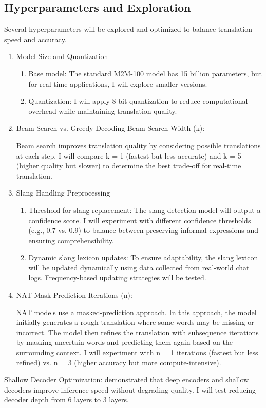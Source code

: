 \documentclass[10pt,twocolumn]{article}
\begin{document}
\subsection{Hyperparameters and Exploration}
Several hyperparameters will be explored and optimized to balance translation speed and accuracy.


\begin{enumerate}
    \item Model Size and Quantization
    \begin{enumerate}
        \item Base model: The standard M2M-100 model has 15 billion parameters, but for real-time applications, I will explore smaller versions.
        \item Quantization: I will apply 8-bit quantization \cite{ZafrirQ8BERT2019} to reduce computational overhead while maintaining translation quality.
    \end{enumerate}
    \item Beam Search vs. Greedy Decoding
Beam Search Width (k): 

Beam search improves translation quality by considering possible translations at each step. I will compare k = 1 (fastest but less accurate) and k = 5 (higher quality but slower) to determine the best trade-off for real-time translation.

    \item Slang Handling Preprocessing
    \begin{enumerate}
        \item Threshold for slang replacement: The slang-detection model will output a confidence score. I will experiment with different confidence thresholds (e.g., 0.7 vs. 0.9) to balance between preserving informal expressions and ensuring comprehensibility.
        \item Dynamic slang lexicon updates: To ensure adaptability, the slang lexicon will be updated dynamically using data collected from real-world chat logs. Frequency-based updating strategies will be tested.
    \end{enumerate}
    \item NAT Mask-Prediction Iterations (n): 

NAT models use a masked-prediction approach. In this approach, the model initially generates a rough translation where some words may be missing or incorrect. The model then refines the translation with subsequence iterations by masking uncertain words and predicting them again based on the surrounding context. I will experiment with n = 1 iterations (fastest but less refined) vs. n = 3 (higher accuracy but more compute-intensive).


\end{enumerate}
Shallow Decoder Optimization: \textcite{KasaiDeepEncoders2021} demonstrated that deep encoders and shallow decoders improve inference speed without degrading quality. I will test reducing decoder depth from 6 layers to 3 layers.
\end{document}
